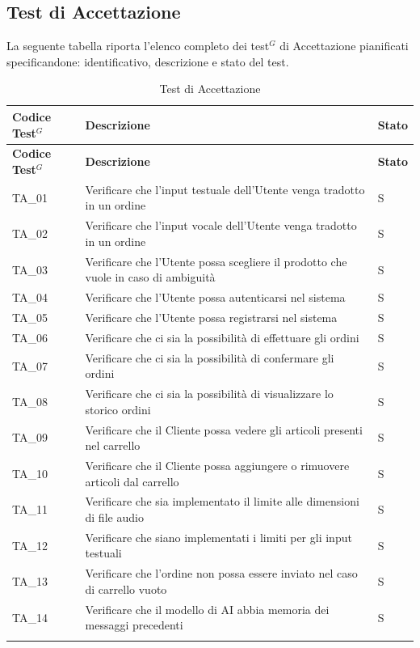 \subsection{Test di Accettazione}
La seguente tabella riporta l’elenco completo dei test$^G$ di Accettazione pianificati specificandone: identificativo, descrizione e stato del test.
\begin{longtable}{|
		>{\raggedright\arraybackslash}p{} |
		>{\centering\arraybackslash}p{} |
		>{\centering\arraybackslash}p{} |
	}
	\hline
	\rowcolor[gray]{0.9}
	\textbf{Codice Test$^G$} & \textbf{Descrizione} & \textbf{Stato}\\
	\hline
	\endfirsthead
	
	\hline
	\rowcolor[gray]{0.9}
	\textbf{Codice Test$^G$} & \textbf{Descrizione} & \textbf{Stato}\\
	\hline
	\endhead
	
	\hline
	TA\_01 & Verificare che l'input testuale dell'Utente venga tradotto in un ordine & S \\ \hline
	TA\_02 & Verificare che l'input vocale dell'Utente venga tradotto in un ordine & S \\ \hline
	TA\_03 & Verificare che l'Utente possa scegliere il prodotto che vuole in caso di ambiguità & S \\ \hline
	TA\_04 & Verificare che l'Utente possa autenticarsi nel sistema & S \\ \hline
	TA\_05 & Verificare che l'Utente possa registrarsi nel sistema & S \\ \hline
	TA\_06 & Verificare che ci sia la possibilità di effettuare gli ordini & S \\ \hline
	TA\_07 & Verificare che ci sia la possibilità di confermare gli ordini & S \\ \hline
	TA\_08 & Verificare che ci sia la possibilità di visualizzare lo storico ordini & S \\ \hline
	TA\_09 & Verificare che il Cliente possa vedere gli articoli presenti nel carrello & S \\ \hline
	TA\_10 & Verificare che il Cliente possa aggiungere o rimuovere articoli dal carrello & S \\ \hline
	TA\_11 & Verificare che sia implementato il limite alle dimensioni di file audio & S \\ \hline
	TA\_12 & Verificare che siano implementati i limiti per gli input testuali & S \\ \hline
	TA\_13 & Verificare che l'ordine non possa essere inviato nel caso di carrello vuoto & S \\ \hline
	TA\_14 & Verificare che il modello di AI abbia memoria dei messaggi precedenti & S \\ \hline
	
	\caption{Test di Accettazione}
\end{longtable}
